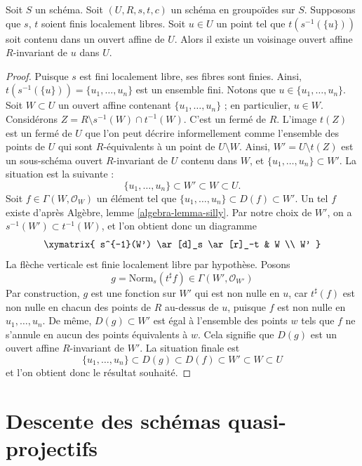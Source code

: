 \begin{lemma}
\label{lemma-find-invariant-affine}
Soit $S$ un schéma.
Soit $(U, R, s, t, c)$ un schéma en groupoïdes sur $S$.
Supposons que $s$, $t$ soient finis localement libres.
Soit $u \in U$ un point tel que $t(s^{-1}(\{u\}))$
soit contenu dans un ouvert affine de $U$.
Alors il existe un voisinage ouvert affine $R$-invariant
de $u$ dans $U$.
\end{lemma}

\begin{proof}
Puisque $s$ est fini localement libre, ses fibres sont finies. Ainsi,
$t(s^{-1}(\{u\})) = \{u_1, \ldots, u_n\}$ est un ensemble fini.
Notons que $u \in \{u_1, \ldots, u_n\}$.
Soit $W \subset U$ un ouvert affine contenant $\{u_1, \ldots, u_n\}$ ;
en particulier, $u \in W$. Considérons
$Z = R \setminus s^{-1}(W) \cap t^{-1}(W)$. C'est un fermé
de $R$. L'image $t(Z)$ est un fermé de $U$ que l'on peut décrire
informellement comme l'ensemble des points de $U$ qui sont $R$-équivalents à un point
de $U \setminus W$. Ainsi, $W' = U \setminus t(Z)$ est un sous-schéma ouvert $R$-invariant
de $U$ contenu dans $W$, et $\{u_1, \ldots, u_n\} \subset W'$.
La situation est la suivante :
$$
\{u_1, \ldots, u_n\} \subset W' \subset W \subset U.
$$
Soit $f \in \Gamma(W, \mathcal{O}_W)$ un élément tel que
$\{u_1, \ldots, u_n\} \subset D(f) \subset W'$. Un tel $f$ existe d'après
Algèbre, lemme \ref{algebra-lemma-silly}. Par notre choix de $W'$,
on a $s^{-1}(W') \subset t^{-1}(W)$, et l'on obtient donc un diagramme
$$
\xymatrix{
s^{-1}(W') \ar[d]_s \ar[r]_-t & W \\
W'
}
$$
La flèche verticale est finie localement libre par hypothèse. Posons
$$
g = \text{Norm}_s(t^\sharp f) \in \Gamma(W', \mathcal{O}_{W'})
$$
Par construction, $g$ est une fonction sur $W'$ qui est
non nulle en $u$, car $t^\sharp(f)$ est non nulle en chacun des points de
$R$ au-dessus de $u$, puisque $f$ est non nulle en $u_1, \ldots, u_n$.
De même, $D(g) \subset W'$ est égal à
l'ensemble des points $w$ tels que $f$ ne s'annule en aucun des points
équivalents à $w$. Cela signifie que $D(g)$ est un
ouvert affine $R$-invariant de $W'$. La situation finale est
$$
\{u_1, \ldots, u_n\} \subset D(g) \subset D(f) \subset W' \subset W \subset U
$$
et l'on obtient donc le résultat souhaité.
\end{proof}







\section{Descente des schémas quasi-projectifs}
\label{section-quasi-projective}

